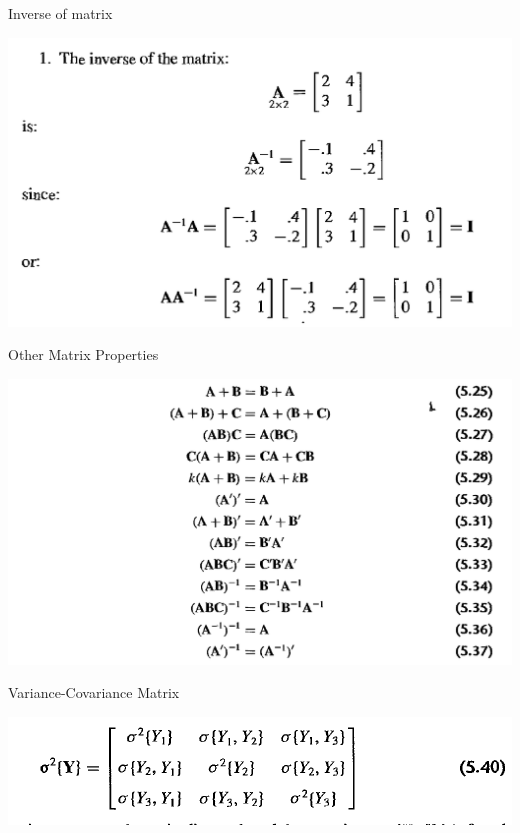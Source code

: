 \documentclass[
  ignorenonframetext,
]{beamer}
\begin{document}
\begin{frame}{Inverse of matrix}
\protect\hypertarget{inverse-of-matrix}{}

\begin{center}\includegraphics[width=1\linewidth]{resources/Class 02  - mm inverse} \end{center}

\end{frame}

\begin{frame}{Other Matrix Properties}
\protect\hypertarget{other-matrix-properties}{}

\begin{center}\includegraphics[width=1\linewidth]{resources/Class 02 - matrix props} \end{center}

\end{frame}

\begin{frame}{Variance-Covariance Matrix}
\protect\hypertarget{variance-covariance-matrix}{}

\begin{center}\includegraphics[width=1\linewidth]{resources/Class 02 - mm varcov} \end{center}

\end{frame}
\end{document}
